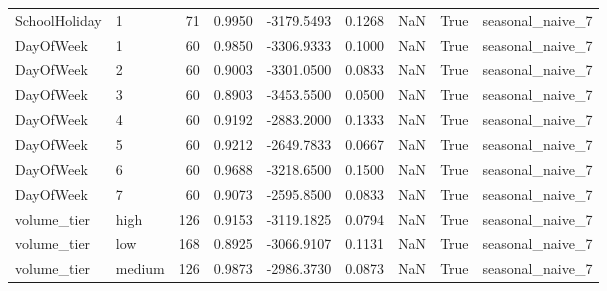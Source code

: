 \begin{table}
\begin{tabular}{llrrrrrrl}
SchoolHoliday & 1 & 71 & 0.9950 & -3179.5493 & 0.1268 & NaN & True & seasonal\_naive\_7 \\
DayOfWeek & 1 & 60 & 0.9850 & -3306.9333 & 0.1000 & NaN & True & seasonal\_naive\_7 \\
DayOfWeek & 2 & 60 & 0.9003 & -3301.0500 & 0.0833 & NaN & True & seasonal\_naive\_7 \\
DayOfWeek & 3 & 60 & 0.8903 & -3453.5500 & 0.0500 & NaN & True & seasonal\_naive\_7 \\
DayOfWeek & 4 & 60 & 0.9192 & -2883.2000 & 0.1333 & NaN & True & seasonal\_naive\_7 \\
DayOfWeek & 5 & 60 & 0.9212 & -2649.7833 & 0.0667 & NaN & True & seasonal\_naive\_7 \\
DayOfWeek & 6 & 60 & 0.9688 & -3218.6500 & 0.1500 & NaN & True & seasonal\_naive\_7 \\
DayOfWeek & 7 & 60 & 0.9073 & -2595.8500 & 0.0833 & NaN & True & seasonal\_naive\_7 \\
volume\_tier & high & 126 & 0.9153 & -3119.1825 & 0.0794 & NaN & True & seasonal\_naive\_7 \\
volume\_tier & low & 168 & 0.8925 & -3066.9107 & 0.1131 & NaN & True & seasonal\_naive\_7 \\
volume\_tier & medium & 126 & 0.9873 & -2986.3730 & 0.0873 & NaN & True & seasonal\_naive\_7 \\
\bottomrule
\end{tabular}
\end{table}
